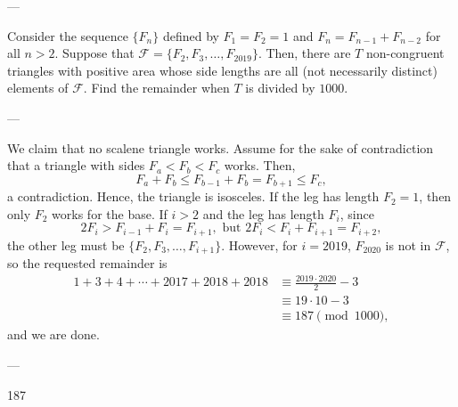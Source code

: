 
---

Consider the sequence $\{F_n\}$ defined by $F_1=F_2=1$ and $F_n=F_{n-1}+F_{n-2}$ for all $n>2$. Suppose that $\mathcal{F}=\{F_2,F_3,\ldots,F_{2019}\}$. Then, there are $T$ non-congruent triangles with positive area whose side lengths are all (not necessarily distinct) elements of $\mathcal{F}$. Find the remainder when $T$ is divided by $1000$.

---

We claim that no scalene triangle works. Assume for the sake of contradiction that a triangle with sides $F_a<F_b<F_c$ works. Then, $$F_a+F_b\le F_{b-1}+F_b=F_{b+1}\le F_c,$$
a contradiction. Hence, the triangle is isosceles. If the leg has length $F_2=1$, then only $F_2$ works for the base. If $i>2$ and the leg has length $F_i$, since $$2F_i>F_{i-1}+F_i=F_{i+1},\text{ but }2F_i<F_i+F_{i+1}=F_{i+2},$$
the other leg must be $\{F_2,F_3,\ldots,F_{i+1}\}$. However, for $i=2019$, $F_{2020}$ is not in $\mathcal{F}$, so the requested remainder is
\begin{align*}
    1+3+4+\cdots+2017+2018+2018&\equiv\frac{2019\cdot 2020}2-3\\
    &\equiv 19\cdot 10-3\\
    &\equiv 187\pmod{1000},
\end{align*}
and we are done.

---

187
